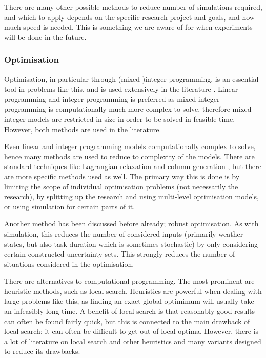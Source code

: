 \documentclass[a4paper,12pt]{article}
\begin{document}
There are many other possible methods to reduce number of simulations required, and which to apply depends on the specific research project and goals, and how much speed is needed. This is something we are aware of for when experiments will be done in the future. 

\bigskip

\subsubsection{Optimisation} \label{ss:opt}
Optimisation, in particular through (mixed-)integer programming, is an essential tool in problems like this, and is used extensively in the literature \cite{nemhauser1999integer,lee2011mixed}. Linear programming and integer programming is preferred as mixed-integer programming is computationally much more complex to solve, therefore mixed-integer models are restricted in size in order to be solved in feasible time. However, both methods are used in the literature.

Even linear and integer programming models computationally complex to solve, hence many methods are used to reduce to complexity of the models. There are standard techniques like Lagrangian relaxation \cite{fisher1981lagrangian} and column generation \cite{barnhart1998branch}, but there are more specific methods used as well. The primary way this is done is by limiting the scope of individual optimisation problems (not necessarily the research), by splitting up the research and using multi-level optimisation models, or using simulation for certain parts of it. 

Another method has been discussed before already; robust optimisation. As with simulation, this reduces the number of considered inputs (primarily weather states, but also task duration which is sometimes stochastic) by only considering certain constructed uncertainty sets. This strongly reduces the number of situations considered in the optimisation. 

There are alternatives to computational programming. The most prominent are heuristic methods, such as local search. Heuristics are powerful when dealing with large problems like this, as finding an exact global optimimum will usually take an infeasibly long time. A benefit of local search is that reasonably good results can often be found fairly quick, but this is connected to the main drawback of local search; it can often be difficult to get out of local optima. However, there is a lot of literature on local search and other heuristics and many variants designed to reduce its drawbacks. 
\end{document}
